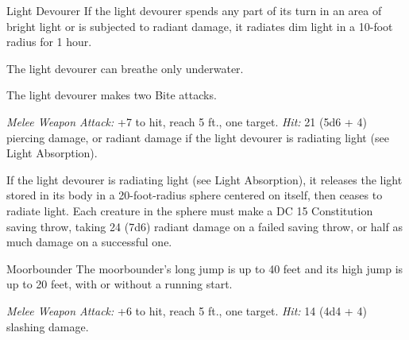 \documentclass[10pt,a4paper,twoside,fancy,bg=print,twocolumn,openany,nodeprecatedcode]{dndbook}
\begin{document}
\begin{DndMonster}[float=t]{Light Devourer}
\DndMonsterBasics[
armor-class = {14},
hit-points = {\DndDice{14d8 + 56}},
speed = {0 ft., swim 30 ft.}
]
\DndMonsterAbilityScores[
 str = 18,
 dex = 18,
 con = 18,
 int = 2,
 wis = 10,
 cha = 3
]
\DndMonsterDetails[
skills = {Perception +3, Stealth +10},
damage-immunities = {radiant},
senses = {darkvision 120 ft., passive perception 13},
challenge = 6,
]
If the light devourer spends any part of its turn in an area of bright light or is subjected to radiant damage, it radiates dim light in a 10-foot radius for 1 hour.

The light devourer can breathe only underwater.

The light devourer makes two Bite attacks.

\textsl{Melee Weapon Attack:} +7 to hit, reach 5 ft., one target. \textsl{Hit:} 21 (5d6 + 4) piercing damage, or radiant damage if the light devourer is radiating light (see Light Absorption).

If the light devourer is radiating light (see Light Absorption), it releases the light stored in its body in a 20-foot-radius sphere centered on itself, then ceases to radiate light. Each creature in the sphere must make a DC 15 Constitution saving throw, taking 24 (7d6) radiant damage on a failed saving throw, or half as much damage on a successful one.

\end{DndMonster}


\begin{DndMonster}[float=t]{Moorbounder}
\DndMonsterBasics[
armor-class = {13 (natural armor)},
hit-points = {\DndDice{4d10 + 8}},
speed = {70 ft.}
]
\DndMonsterAbilityScores[
 str = 18,
 dex = 14,
 con = 14,
 int = 2,
 wis = 13,
 cha = 5
]
\DndMonsterDetails[
senses = {darkvision 60 ft., passive perception 11},
challenge = 1,
]
The moorbounder's long jump is up to 40 feet and its high jump is up to 20 feet, with or without a running start.

\textsl{Melee Weapon Attack:} +6 to hit, reach 5 ft., one target. \textsl{Hit:} 14 (4d4 + 4) slashing damage.

\end{DndMonster}
\end{document}
